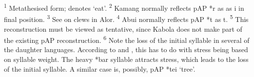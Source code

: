 \raggedright

\textsuperscript{1} Metathesised form; denotes `eat'.  \textsuperscript{2} Kamang normally\textsuperscript{} reflects pAP *r as as i in final position.  \textsuperscript{3} See \citet{Rodemeier1992} on clews in Alor.  \textsuperscript{4} Abui normally reflects pAP *t as t.  \textsuperscript{5} This reconstruction must be viewed as tentative, since Kabola does not make part of the existing pAP reconstruction.  \textsuperscript{6} Note the loss of the initial syllable in several of the daughter languages. According to \citet{HoltonEtAl2012} and \citet{HoltonRobinsonTVhistory}, this has to do with stress being based on syllable weight. The heavy *bar syllable attracts stress, which leads to the loss of the initial syllable. A similar case is, possibly, pAP *tei `tree'.





